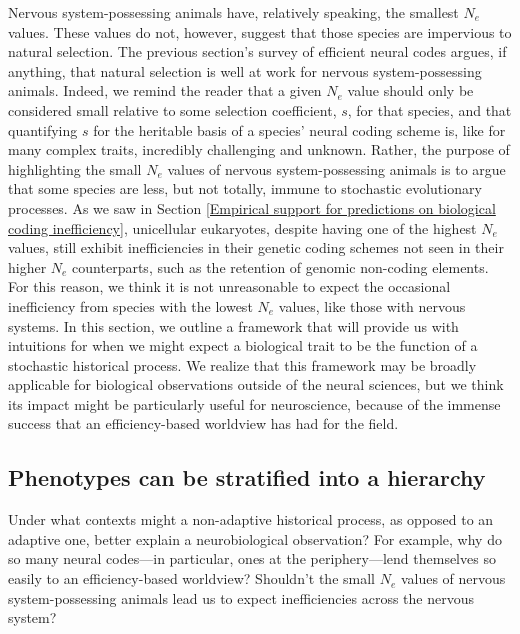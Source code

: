 \documentclass[twocolumn]{article}
\begin{document}
Nervous system-possessing animals have, relatively speaking, the smallest $N_e$ values. These values do not, however, suggest that those species are impervious to natural selection. The previous section's survey of efficient neural codes argues, if anything, that natural selection is well at work for nervous system-possessing animals. Indeed, we remind the reader that a given $N_e$ value should only be considered small relative to some selection coefficient, $s$, for that species, and that quantifying $s$ for the heritable basis of a species' neural coding scheme is, like for many complex traits, incredibly challenging and unknown. Rather, the purpose of highlighting the small $N_e$ values of nervous system-possessing animals is to argue that some species are less, but not totally, immune to stochastic evolutionary processes. As we saw in Section \ref{Empirical support for predictions on biological coding inefficiency}, unicellular eukaryotes, despite having one of the highest $N_e$ values, still exhibit inefficiencies in their genetic coding schemes not seen in their higher $N_e$ counterparts, such as the retention of genomic non-coding elements. For this reason, we think it is not unreasonable to expect the occasional inefficiency from species with the lowest $N_e$ values, like those with nervous systems. In this section, we outline a framework that will provide us with intuitions for when we might expect a biological trait to be the function of a stochastic historical process. We realize that this framework may be broadly applicable for biological observations outside of the neural sciences, but we think its impact might be particularly useful for neuroscience, because of the immense success that an efficiency-based worldview has had for the field. 

\subsection{Phenotypes can be stratified into a hierarchy}

Under what contexts might a non-adaptive historical process, as opposed to an adaptive one, better explain a neurobiological observation? For example, why do so many neural codes---in particular, ones at the periphery---lend themselves so easily to an efficiency-based worldview? Shouldn't the small $N_e$ values of nervous system-possessing animals lead us to expect inefficiencies across the nervous system? 
\end{document}
